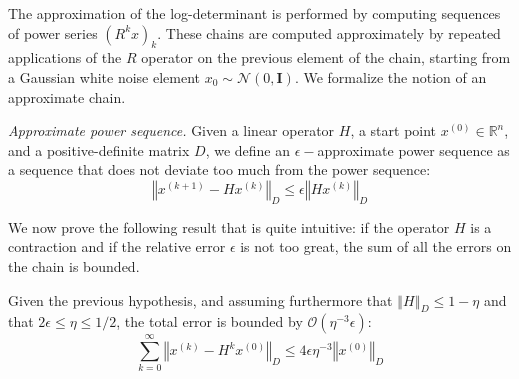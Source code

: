 The approximation of the log-determinant is performed by computing
sequences of power series $\left(R^{k}x\right)_{k}$. These chains
are computed approximately by repeated applications of the $R$ operator
on the previous element of the chain, starting from a Gaussian white
noise element $x_{0}\sim\mathcal{N}\left(0,\mathbf{I}\right)$. We
formalize the notion of an approximate chain. 

\begin{definition} \emph{Approximate power sequence. }Given a linear
operator $H$, a start point $x^{\left(0\right)}\in\mathbb{R}^{n}$,
and a positive-definite matrix $D$, we define an $\epsilon-$approximate
power sequence as a sequence that does not deviate too much from the
power sequence: 
\[
\left\Vert x^{\left(k+1\right)}-Hx^{\left(k\right)}\right\Vert _{D}\leq\epsilon\left\Vert Hx^{\left(k\right)}\right\Vert _{D}
\]


\end{definition}

We now prove the following result that is quite intuitive: if the
operator $H$ is a contraction and if the relative error $\epsilon$
is not too great, the sum of all the errors on the chain is bounded. 

\begin{lemma} Given the previous hypothesis, and assuming furthermore
that $\left\Vert H\right\Vert _{D}\leq1-\eta$ and that $2\epsilon\leq\eta\leq1/2$,
the total error is bounded by $\mathcal{O}\left(\eta^{-3}\epsilon\right)$:
\[
\sum_{k=0}^{\infty}\left\Vert x^{\left(k\right)}-H^{k}x^{\left(0\right)}\right\Vert _{D}\leq4\epsilon\eta^{-3}\left\Vert x^{\left(0\right)}\right\Vert _{D}
\]
\end{lemma}

